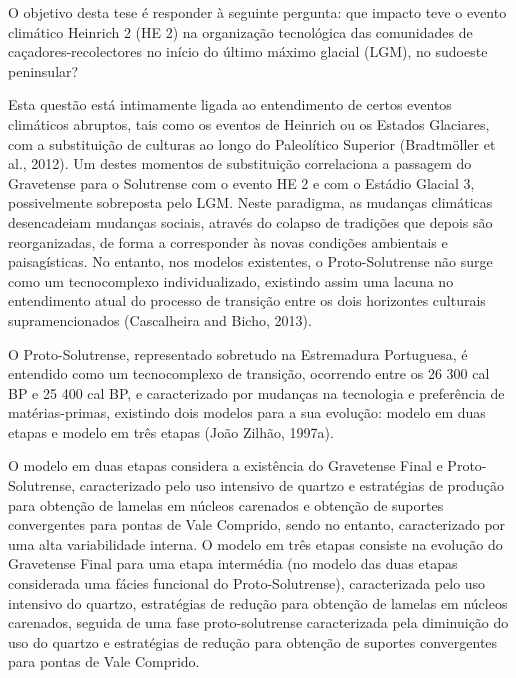 \documentclass[12pt,twoside]{reedthesis}
\begin{document}
  \begin{resumo}
    O objetivo desta tese é responder à seguinte pergunta: que impacto teve o evento climático Heinrich 2 (HE 2) na organização tecnológica das comunidades de caçadores-recolectores no início do último máximo glacial (LGM), no sudoeste peninsular?
    
    \par
    
    Esta questão está intimamente ligada ao entendimento de certos eventos climáticos abruptos, tais como os eventos de Heinrich ou os Estados Glaciares, com a substituição de culturas ao longo do Paleolítico Superior (Bradtmöller et al., 2012). Um destes momentos de substituição correlaciona a passagem do Gravetense para o Solutrense com o evento HE 2 e com o Estádio Glacial 3, possivelmente sobreposta pelo LGM. Neste paradigma, as mudanças climáticas desencadeiam mudanças sociais, através do colapso de tradições que depois são reorganizadas, de forma a corresponder às novas condições ambientais e paisagísticas. No entanto, nos modelos existentes, o Proto-Solutrense não surge como um tecnocomplexo individualizado, existindo assim uma lacuna no entendimento atual do processo de transição entre os dois horizontes culturais supramencionados (Cascalheira and Bicho, 2013).
    
    O Proto-Solutrense, representado sobretudo na Estremadura Portuguesa, é entendido como um tecnocomplexo de transição, ocorrendo entre os 26 300 cal BP e 25 400 cal BP, e caracterizado por mudanças na tecnologia e preferência de matérias-primas, existindo dois modelos para a sua evolução: modelo em duas etapas e modelo em três etapas (João Zilhão, 1997a).
    
    O modelo em duas etapas considera a existência do Gravetense Final e Proto-Solutrense, caracterizado pelo uso intensivo de quartzo e estratégias de produção para obtenção de lamelas em núcleos carenados e obtenção de suportes convergentes para pontas de Vale Comprido, sendo no entanto, caracterizado por uma alta variabilidade interna. O modelo em três etapas consiste na evolução do Gravetense Final para uma etapa intermédia (no modelo das duas etapas considerada uma fácies funcional do Proto-Solutrense), caracterizada pelo uso intensivo do quartzo, estratégias de redução para obtenção de lamelas em núcleos carenados, seguida de uma fase proto-solutrense caracterizada pela diminuição do uso do quartzo e estratégias de redução para obtenção de suportes convergentes para pontas de Vale Comprido.
    

\end{resumo}
\end{document}
